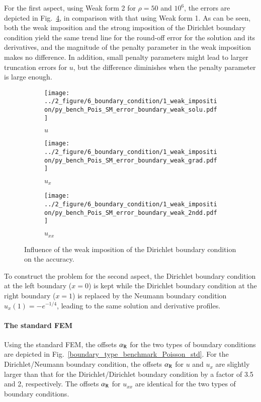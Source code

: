 \documentclass[review,3p]{elsarticle}
\begin{document}
For the first aspect, using Weak form 2 for $\rho=50$ and $10^6$, the errors are depicted in Fig.~\ref{py_bench_Pois_SM_error_boundary_weak}, in comparison with that using Weak form 1. As can be seen, both the weak imposition and the strong imposition of the Dirichlet boundary condition yield the same trend line for the round-off error for the solution and its derivatives, and the magnitude of the penalty parameter in the weak imposition makes no difference. In addition, small penalty parameters might lead to larger truncation errors for $u$, but the difference diminishes when the penalty parameter is large enough.

\begin{figure}[!ht]
    \begin{subfigure}{5.5cm}
        \texttt{[image: ../2\_figure/6\_boundary\_condition/1\_weak\_imposition/py\_bench\_Pois\_SM\_error\_boundary\_weak\_solu.pdf]}
        \caption{$u$}
        \label{py_bench_Pois_SM_error_boundary_weak_solu}
    \end{subfigure}
    \hspace{-0.2cm}
    \begin{subfigure}{5.5cm}
        \texttt{[image: ../2\_figure/6\_boundary\_condition/1\_weak\_imposition/py\_bench\_Pois\_SM\_error\_boundary\_weak\_grad.pdf]}
        \caption{$u_x$}
        \label{py_bench_Pois_SM_error_boundary_weak_grad}
    \end{subfigure}
    \hspace{-0.2cm}
    \begin{subfigure}{5.5cm}
        \texttt{[image: ../2\_figure/6\_boundary\_condition/1\_weak\_imposition/py\_bench\_Pois\_SM\_error\_boundary\_weak\_2ndd.pdf]}
        \caption{$u_{xx}$}
        \label{py_bench_Pois_SM_error_boundary_weak_2ndd}
    \end{subfigure}
\caption{Influence of the weak imposition of the Dirichlet boundary condition on the accuracy.}
\label{py_bench_Pois_SM_error_boundary_weak}
\end{figure}

To construct the problem for the second aspect, the Dirichlet boundary condition at the left boundary ($x=0$) is kept while the Dirichlet boundary condition at the right boundary ($x=1$) is replaced by the Neumann boundary condition $u_x (1) = -e^{-1/4}$, leading to the same solution and derivative profiles. 


\paragraph{The standard FEM}
Using the standard FEM, the offsets $\alpha_{\rm R}$ for the two types of boundary conditions are depicted in Fig.~\ref{boundary_type_benchmark_Poisson_std}. 
For the Dirichlet/Neumann boundary condition, the offsets $\alpha_{\rm R}$ for $u$ and $u_x$ are slightly larger than that for the Dirichlet/Dirichlet boundary condition by a factor of 3.5 and 2, respectively. The offsets $\alpha_{\rm R}$ for $u_{xx}$ are identical for the two types of boundary conditions.
\end{document}
